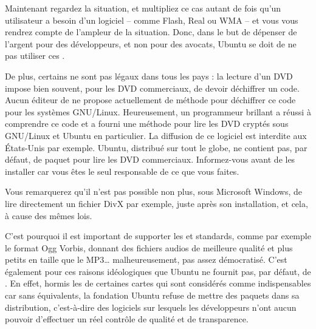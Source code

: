 Maintenant regardez la situation, et multipliez ce cas autant de fois qu'un utilisateur a besoin d'un logiciel  -- comme Flash, Real ou WMA -- et vous vous rendrez compte de l'ampleur de la situation. Donc, dans le but de dépenser de l'argent pour des développeurs, et non pour des avocats, Ubuntu se doit de ne pas utiliser ces .\par
De plus, certains  ne sont pas légaux dans tous les pays : la lecture d'un DVD impose bien souvent, pour les DVD commerciaux, de devoir déchiffrer un code.  Aucun éditeur de  ne propose actuellement de méthode pour déchiffrer ce code pour les systèmes GNU/Linux. Heureusement, un programmeur brillant a réussi à comprendre ce code et a fourni une méthode pour lire les DVD cryptés sous GNU/Linux et Ubuntu en particulier. La diffusion de ce logiciel est interdite aux États-Unis par exemple. Ubuntu, distribué sur tout le globe, ne contient pas, par défaut, de paquet pour lire les DVD commerciaux. Informez-vous avant de les installer car vous êtes le seul responsable de ce que vous faites.\par
\begin{nota}
Vous remarquerez qu'il n'est pas possible non plus, sous Microsoft Windows, de lire directement un fichier DivX par exemple, juste après son installation, et cela, à cause des mêmes lois.
\end{nota}
C'est pourquoi il est important de supporter les   et standards, comme par exemple le format Ogg Vorbis, donnant des fichiers audios de meilleure qualité et plus petits en taille que le MP3\ldots{} malheureusement, pas assez démocratisé. C'est également pour ces raisons idéologiques que Ubuntu ne fournit pas, par défaut, de  . En effet, hormis les   de certaines cartes  qui sont considérés comme indispensables car sans équivalents, la fondation Ubuntu refuse de mettre des paquets  dans sa distribution, c'est-à-dire des logiciels sur lesquels les développeurs n'ont aucun pouvoir d'effectuer un réel contrôle de qualité et de transparence.
